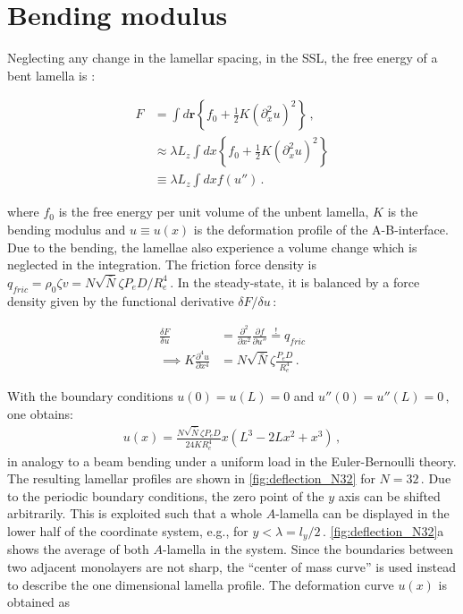 \documentclass[bachelor,       %
               oneside,        %
               BCOR10mm,       %
               ngerman, english %
               ]{GAUBM}
\begin{document}
\section{Bending modulus}


Neglecting any change in the lamellar spacing, in the \ac{SSL}, the free energy of a bent lamella is \cite{wang94}:

\begin{align}
    F&=\int d\mathbf r\left\{f_0+\frac{1}{2}K \left(\partial_x^2 u\right)^2\right\}\,,\\
    &\approx \lambda L_z\int dx\left\{f_0+\frac{1}{2}K \left(\partial_x^2 u\right)^2\right\}\nonumber\\
    &\equiv \lambda L_z\int dxf(u'')\,.
    \label{eq:F_bend}
\end{align}

where $f_0$ is the free energy per unit volume of the unbent lamella, $K$ is the bending modulus and $u\equiv u(x)$ is the deformation profile of the A-B-interface. Due to the bending, the lamellae also experience a volume change which is neglected in the integration. The friction force density is $q_{fric}=\rho_0\zeta v=N\sqrt{\bar N}\zeta P_eD/R_e^4\,.$ In the steady-state, it is balanced by a force density given by the  functional derivative $\delta F/\delta u\,$:

\begin{align}
    \frac{\delta F}{\delta u}&=\frac{\partial^2}{\partial x^2}\frac{\partial f}{\partial u''}\overset{!}{=}q_{fric} \nonumber \\
    \implies K\frac{\partial^4u}{\partial x^4}&=N\sqrt{\bar N}\zeta\frac{P_eD}{R_e^4} \,.
\end{align}


With the boundary conditions $u(0)=u(L)=0$ and $u''(0)=u''(L)=0\,,$ one obtains:
\begin{align}
    u(x)=\frac{N\sqrt{\bar N}\zeta P_e D}{24KR_e^4}x(L^3-2Lx^2+x^3)\,,
    \label{eq:deflection}
\end{align}
in analogy to a beam bending under a uniform load in the Euler-Bernoulli theory. The resulting lamellar profiles are shown in \autoref{fig:deflection_N32} for $N=32\,.$ Due to the periodic boundary conditions, the zero point of the $y$ axis can be shifted arbitrarily. This is exploited such that a whole $A$-lamella can be displayed in the lower half of the coordinate system, e.g., for $y<\lambda =l_y/2\,.$ \autoref{fig:deflection_N32}a shows the average of both $A$-lamella in the system. Since the boundaries between two adjacent monolayers are not sharp, the \enquote{center of mass curve} is used instead to describe the one dimensional lamella profile. The deformation curve $u(x)$ is obtained as
\end{document}

